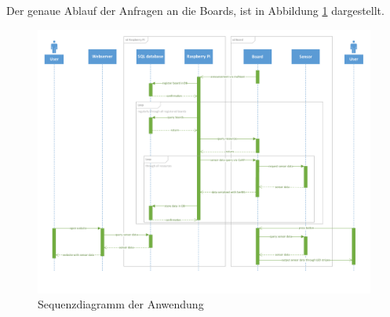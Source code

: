 \documentclass[a4paper]{article}
\begin{document}
Der genaue Ablauf der Anfragen an die Boards, ist in Abbildung \ref{fig:seq_diagram} 
dargestellt.
\begin{figure}[h]
\centering
\includegraphics[scale=0.7]{sequenceDiagram.pdf}
\caption{\label{fig:seq_diagram}Sequenzdiagramm der Anwendung}
\end{figure}
\end{document}
